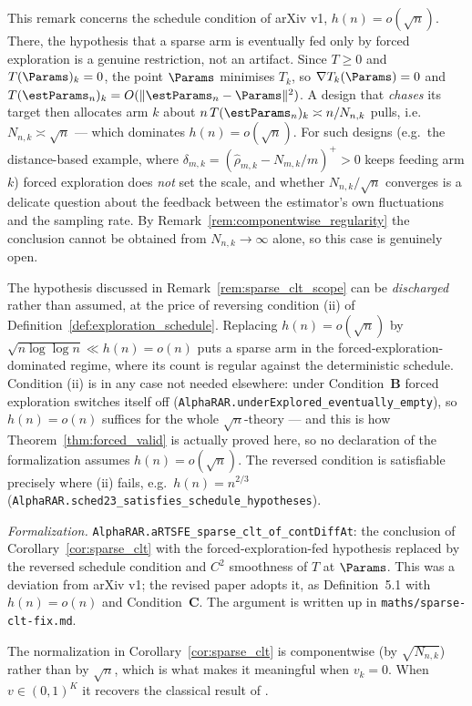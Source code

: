 \begin{remark}\label{rem:sparse_clt_scope}
This remark concerns the schedule condition of arXiv v1, $h(n)=o(\sqrt n)$. There, the hypothesis
that a sparse arm is eventually fed only by forced exploration is a genuine
restriction, not an artifact. Since $T\ge0$ and $T(\Params)_k=0$, the point $\Params$ minimises
$T_k$, so $\nabla T_k(\Params)=0$ and $T(\estParams_n)_k=O(\|\estParams_n-\Params\|^2)$. A design
that \emph{chases} its target then allocates arm $k$ about $n\,T(\estParams_n)_k\asymp n/N_{n,k}$
pulls, i.e.\ $N_{n,k}\asymp\sqrt n$ --- which dominates $h(n)=o(\sqrt n)$. For such designs (e.g.\ the
distance-based example, where $\delta_{m,k}=(\hat\rho_{m,k}-N_{m,k}/m)^+>0$ keeps feeding arm $k$)
forced exploration does \emph{not} set the scale, and whether $N_{n,k}/\sqrt n$ converges is a
delicate question about the feedback between the estimator's own fluctuations and the sampling rate.
By Remark~\ref{rem:componentwise_regularity} the conclusion cannot be obtained from
$N_{n,k}\to\infty$ alone, so this case is genuinely open.
\end{remark}

\begin{remark}\label{rem:sparse_clt_fix}
The hypothesis discussed in Remark~\ref{rem:sparse_clt_scope} can be \emph{discharged} rather than
assumed, at the price of reversing condition (ii) of Definition~\ref{def:exploration_schedule}.
Replacing $h(n)=o(\sqrt n)$ by $\sqrt{n\log\log n}\ll h(n)=o(n)$ puts a sparse arm in the
forced-exploration-dominated regime, where its count is regular against the deterministic schedule.
Condition (ii) is in any case not needed elsewhere: under Condition~\textbf{B} forced exploration
switches itself off (\texttt{AlphaRAR.underExplored\_eventually\_empty}), so $h(n)=o(n)$ suffices for
the whole $\sqrt n$-theory --- and this is how Theorem~\ref{thm:forced_valid} is actually proved
here, so no declaration of the formalization assumes $h(n)=o(\sqrt n)$. The reversed condition is satisfiable precisely where (ii) fails, e.g.\
$h(n)=n^{2/3}$ (\texttt{AlphaRAR.sched23\_satisfies\_schedule\_hypotheses}).

\emph{Formalization.} \texttt{AlphaRAR.aRTSFE\_sparse\_clt\_of\_contDiffAt}: the conclusion of
Corollary~\ref{cor:sparse_clt} with the forced-exploration-fed hypothesis replaced by the reversed
schedule condition and $C^2$ smoothness of $T$ at $\Params$. This was a deviation from arXiv v1;
the revised paper adopts it, as Definition~5.1 with $h(n)=o(n)$ and Condition~\textbf{C}. The
argument is written up in \texttt{maths/sparse-clt-fix.md}.
\end{remark}

\begin{remark}\label{rem:sparse_normalization}
The normalization in Corollary~\ref{cor:sparse_clt} is componentwise (by
$\sqrt{N_{n,k}}$) rather than by $\sqrt n$, which is what makes it meaningful when
$v_k=0$. When $v\in(0,1)^K$ it recovers the classical result of
\cite{hu2006asymptotically}.
\end{remark}
